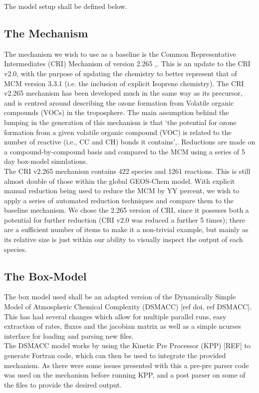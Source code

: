 \documentclass{pasa}%
\begin{document}
The model setup shall be defined below. 

\subsection{The Mechanism}
The mechanism we wish to use as a baseline is the Common Representative Intermediates (CRI) Mechanism of version 2.265 ,\cite{criv2}. This is an update to the CRI v2.0, with the purpose of updating the chemistry to better represent that of MCM version 3.3.1 (i.e. the inclusion of explicit Isoprene chemistry). The CRI v2.265 mechanism has been developed much in the same way as its precursor, and is centred around describing the ozone formation from Volatile organic compounds (VOCs) in the troposphere. The main assumption behind the lumping in the generation of this mechanism is that `the potential for ozone formation from a given volatile organic compound (VOC) is related to the number of reactive (i.e., CC and CH) bonds it contains',\cite{cri}. Reductions are made on a compound-by-compound basis and compared to the MCM using a series of 5 day box-model simulations. \\

The CRI v2.265 mechanism contains 422 species and 1261 reactions. This is still almost double of those within the global GEOS-Chem model. With explicit manual reduction being used to reduce the MCM by YY percent, we wish to apply a series of automated reduction techniques and compare them to the baseline mechanism. We chose the 2.265 version of CRI, since it posesses both a potential for further reduction (CRI v2.0 was reduced a further 5 times); there are a sufficient number of items to make it a non-trivial example, but mainly as its relative size is just within our ability to visually inspect the output of each species. 

\subsection{The Box-Model}
The box model used shall be an adapted version of the Dynamically Simple Model of Atmospheric Chemical Complexity (DSMACC) [ref doi, ref DSMACC]. This has had several changes which allow for multiple parallel runs, easy extraction of rates, fluxes and the jacobian matrix as well as a simple ncurses interface for loading and parsing new files. \\

The DSMACC model works by using the Kinetic Pre Processor (KPP) [REF] to generate Fortran code, which can then be used to integrate the provided mechanism. As there were some issues presented with this a pre-pre parser code was used on the mechanism before running KPP, and a post parser on some of the files to provide the desired output. 
\end{document}
